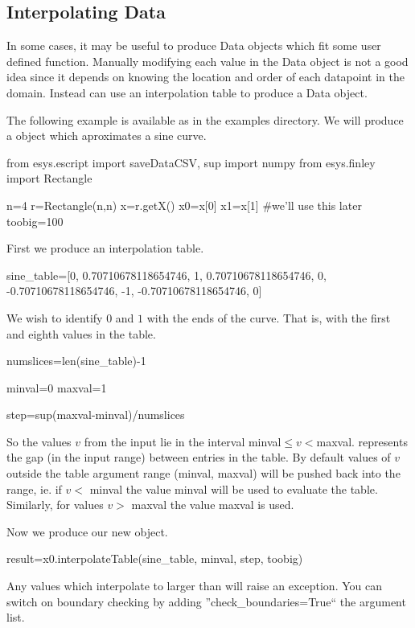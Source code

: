 \subsection{Interpolating Data}
In some cases, it may be useful to produce Data objects which fit some user defined function.
Manually modifying each value in the Data object is not a good idea since it depends on
knowing the location and order of each datapoint in the domain.
Instead \escript can use an interpolation table to produce a Data object.

The following example is available as  in the examples directory.
We will produce a \Data object which aproximates a sine curve.

\begin{python}
from esys.escript import saveDataCSV, sup
import numpy
from esys.finley import Rectangle

n=4
r=Rectangle(n,n)
x=r.getX()
x0=x[0]
x1=x[1]    #we'll use this later
toobig=100	
\end{python}

First we produce an interpolation table.
\begin{python}
sine_table=[0, 0.70710678118654746, 1, 0.70710678118654746, 0,
           -0.70710678118654746, -1, -0.70710678118654746, 0]
\end{python}

We wish to identify $0$ and $1$ with the ends of the curve.
That is, with the first and eighth values in the table.

\begin{python}
numslices=len(sine_table)-1

minval=0
maxval=1

step=sup(maxval-minval)/numslices
\end{python}

So the values $v$ from the input lie in the interval minval$\leq v < $maxval.
 represents the gap (in the input range) between entries in the table.
By default values of $v$ outside the table argument range (minval, maxval) will
be pushed back into the range, ie. if $v <$ minval the value minval will be used to
evaluate the table. Similarly, for values $v>$ maxval the value maxval is used.

Now we produce our new \Data object.

\begin{python}
result=x0.interpolateTable(sine_table, minval, step, toobig)
\end{python}
Any values which interpolate to larger than  will raise an exception. You can
switch on boundary checking by adding ''check_boundaries=True`` the argument list.


